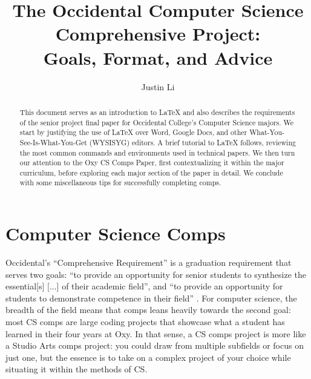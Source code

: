 \documentclass[10pt,twocolumn]{article}
\title{The Occidental Computer Science Comprehensive Project: \\ Goals, Format, and Advice}
\author{Justin Li}
\affiliation{Occidental College}
\begin{document}
\maketitle

\begin{abstract}
    This document serves as an introduction to {\LaTeX} and also describes the requirements of the senior project final paper for Occidental College's Computer Science majors.
    We start by justifying the use of {\LaTeX} over Word, Google Docs, and other What-You-See-Is-What-You-Get (WYSISYG) editors.
    A brief tutorial to {\LaTeX} follows, reviewing the most common commands and environments used in technical papers.
    We then turn our attention to the Oxy CS Comps Paper, first contextualizing it within the major curriculum, before exploring each major section of the paper in detail.
    We conclude with some miscellaneous tips for successfully completing comps.
\end{abstract}

\section{Computer Science Comps}

Occidental's ``Comprehensive Requirement'' is a graduation requirement that serves two goals: ``to provide an opportunity for senior students to synthesize the essential[s] [...] of their academic field'', and ``to provide an opportunity for students to demonstrate competence in their field'' \cite{Occidental2022Comps}.
For computer science, the breadth of the field means that comps leans heavily towards the second goal: most CS comps are large coding projects that showcase what a student has learned in their four years at Oxy.
In that sense, a CS comps project is more like a Studio Arts comps project: you could draw from multiple subfields or focus on just one, but the essence is to take on a complex project of your choice while situating it within the methods of CS.
\end{document}
